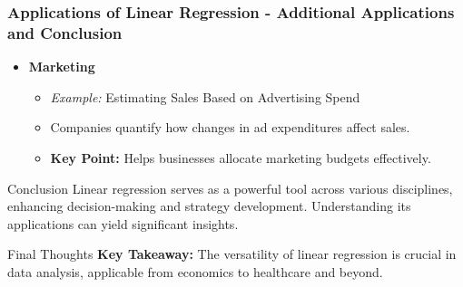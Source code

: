 \documentclass[aspectratio=169]{beamer}
\begin{document}
\begin{frame}[fragile]
    \frametitle{Applications of Linear Regression - Additional Applications and Conclusion}
    \begin{itemize}
        \item \textbf{Marketing}
            \begin{itemize}
                \item \textit{Example:} Estimating Sales Based on Advertising Spend
                \item Companies quantify how changes in ad expenditures affect sales.
                \item \textbf{Key Point:} Helps businesses allocate marketing budgets effectively.
            \end{itemize}
    \end{itemize}

    \begin{block}{Conclusion}
        Linear regression serves as a powerful tool across various disciplines, enhancing decision-making and strategy development. 
        Understanding its applications can yield significant insights.
    \end{block}

    \begin{block}{Final Thoughts}
        \textbf{Key Takeaway:} The versatility of linear regression is crucial in data analysis, applicable from economics to healthcare and beyond.
    \end{block}
\end{frame}
\end{document}
